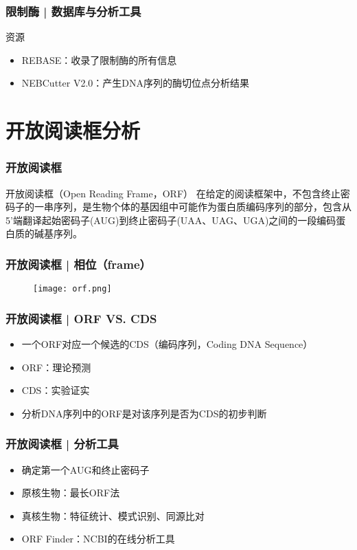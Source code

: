 \begin{frame}
  \frametitle{限制酶 | 数据库与分析工具}
  \begin{block}{资源}
  \begin{itemize}
    \item REBASE：收录了限制酶的所有信息
    \item NEBCutter V2.0：产生DNA序列的酶切位点分析结果
  \end{itemize}
  \end{block}
\end{frame}

\section{开放阅读框分析}
\begin{frame}
  \frametitle{开放阅读框}
  \begin{block}{开放阅读框（Open Reading Frame，ORF）}
    在给定的阅读框架中，不包含终止密码子的一串序列，是生物个体的基因组中可能作为蛋白质编码序列的部分，包含从5'端翻译起始密码子(AUG)到终止密码子(UAA、UAG、UGA)之间的一段编码蛋白质的碱基序列。
  \end{block}
\end{frame}

\begin{frame}
  \frametitle{开放阅读框 | 相位（frame）}
  \begin{figure}
    \centering
    \texttt{[image: orf.png]}
  \end{figure}
\end{frame}

\begin{frame}
  \frametitle{开放阅读框 | \alert{ORF VS. CDS}}
  \pause
  \begin{itemize}
    \item 一个ORF对应一个候选的CDS（编码序列，Coding DNA Sequence）
    \item ORF：理论预测
    \item CDS：实验证实
    \item 分析DNA序列中的ORF是对该序列是否为CDS的初步判断
  \end{itemize}
\end{frame}

\begin{frame}
  \frametitle{开放阅读框 | 分析工具}
  \begin{itemize}
    \item 确定第一个AUG和终止密码子
    \item 原核生物：最长ORF法
    \item 真核生物：特征统计、模式识别、同源比对
    \item ORF Finder：NCBI的在线分析工具
  \end{itemize}
\end{frame}

